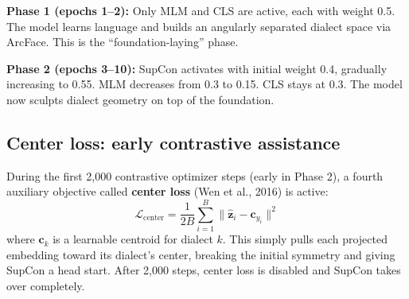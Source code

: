 \documentclass[11pt,a4paper]{article}
\theoremstyle{definition}
\begin{document}
\begin{center}
\end{center}

\textbf{Phase 1 (epochs 1--2):} Only MLM and CLS are active, each
with weight 0.5. The model learns language and builds an angularly
separated dialect space via ArcFace. This is the ``foundation-laying''
phase.

\textbf{Phase 2 (epochs 3--10):} SupCon activates with initial weight
0.4, gradually increasing to 0.55. MLM decreases from 0.3 to 0.15.
CLS stays at 0.3. The model now sculpts dialect geometry on top of the
foundation.

\subsection{Center loss: early contrastive assistance}

During the first 2,000 contrastive optimizer steps (early in Phase 2),
a fourth auxiliary objective called \textbf{center loss} (Wen et al.,
2016) is active:
\[
\mathcal{L}_{\text{center}} = \frac{1}{2B}
\sum_{i=1}^B \|\hat{\mathbf{z}}_i - \mathbf{c}_{y_i}\|^2
\]
where $\mathbf{c}_k$ is a learnable centroid for dialect $k$. This
simply pulls each projected embedding toward its dialect's center,
breaking the initial symmetry and giving SupCon a head start. After
2,000 steps, center loss is disabled and SupCon takes over completely.
\end{document}
